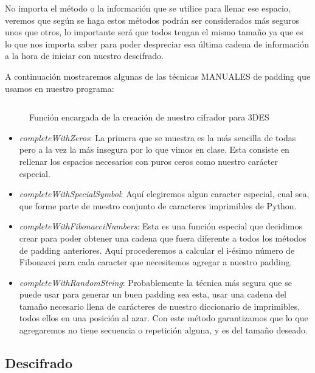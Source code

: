 \documentclass[10pt]{article}
\begin{document}
   		No importa el método o la información que se utilice para llenar ese espacio, veremos que según se haga estos métodos podrán ser considerados más seguros unos que otros, lo importante será que todos tengan el mismo tamaño ya que es lo que nos importa saber para poder despreciar esa última cadena de información a la hora de iniciar con nuestro descifrado.

   		A continuación mostraremos algunas de las técnicas MANUALES de padding que usamos en nuestro programa:

   		\begin{figure}[H]
			\inputminted[linenos, firstnumber=1, breaklines, tabsize=4, firstline=43, lastline=70]{python}{code/App.py}
			\caption{Función encargada de la creación de nuestro cifrador para 3DES}
		\end{figure}

		\begin{itemize}
			\item \textit{completeWithZeros}: La primera que se muestra es la más sencilla de todas pero a la vez la más insegura por lo que vimos en clase. Esta consiste en rellenar los espacios necesarios con puros ceros como nuestro carácter especial.
			\item \textit{completeWithSpecialSymbol}: Aquí elegiremos algun caracter especial, cual sea, que forme parte de nuestro conjunto de caracteres imprimibles de Python.
			\item \textit{completeWithFibonacciNumbers}: Esta es una función especial que decidimos crear para poder obtener una cadena que fuera diferente a todos los métodos de padding anteriores. Aquí procederemos a calcular el i-ésimo número de Fibonacci para cada caracter que necesitemos agregar a nuestro padding. 
			\item \textit{completeWithRandomString}: Probablemente la técnica más segura que se puede usar para generar un buen padding sea esta, usar una cadena del tamaño necesario llena de carácteres de nuestro diccionario de imprimibles, todos ellos en una posición al azar. Con este método garantizamos que lo que agregaremos no tiene secuencia o repetición alguna, y es del tamaño deseado.
		\end{itemize}
		



   	\subsection{Descifrado}
\end{document}
